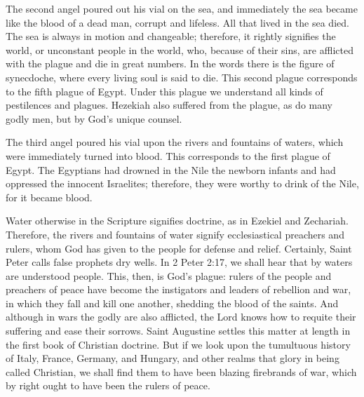 The second angel poured out his vial on the sea, and immediately the sea became like the blood of a dead man, corrupt and lifeless. All that lived in the sea died. The sea is always in motion and changeable; therefore, it rightly signifies the world, or unconstant people in the world, who, because of their sins, are afflicted with the plague and die in great numbers. In the words there is the figure of synecdoche, where every living soul is said to die. This second plague corresponds to the fifth plague of Egypt. Under this plague we understand all kinds of pestilences and plagues. Hezekiah also suffered from the plague, as do many godly men, but by God’s unique counsel.

The third angel poured his vial upon the rivers and fountains of waters, which were immediately turned into blood. This corresponds to the first plague of Egypt. The Egyptians had drowned in the Nile the newborn infants and had oppressed the innocent Israelites; therefore, they were worthy to drink of the Nile, for it became blood.

Water otherwise in the Scripture signifies doctrine, as in Ezekiel and Zechariah. Therefore, the rivers and fountains of water signify ecclesiastical preachers and rulers, whom God has given to the people for defense and relief. Certainly, Saint Peter calls false prophets dry wells. In 2 Peter 2:17, we shall hear that by waters are understood people. This, then, is God’s plague: rulers of the people and preachers of peace have become the instigators and leaders of rebellion and war, in which they fall and kill one another, shedding the blood of the saints. And although in wars the godly are also afflicted, the Lord knows how to requite their suffering and ease their sorrows. Saint Augustine settles this matter at length in the first book of Christian doctrine. But if we look upon the tumultuous history of Italy, France, Germany, and Hungary, and other realms that glory in being called Christian, we shall find them to have been blazing firebrands of war, which by right ought to have been the rulers of peace.

